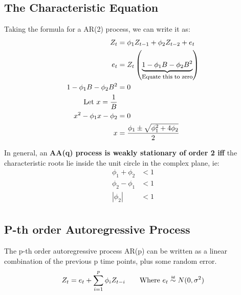 \subsection{The Characteristic Equation}
Taking the formula for a AR(2) process, we can write it as:
\begin{equation*}
    \begin{aligned}
        Z_{t} &= \phi_{1}Z_{t-1} + \phi_{2}Z_{t-2} + e_t \\
        e_{t} &= Z_{t}\left( \explain{1 - \phi_{1}B - \phi_{2}B^{2}}{Equate
        this to zero} \right) \\
                1 - \phi_{1}B - \phi_{2}B^{2} &= 0 \\
                \text{Let $x = \frac{1}{B}$} &\\
                x^{2} - \phi_{1}x - \phi_{2} &= 0 \\
                x &= \frac{\phi_{1} \pm \sqrt{\phi^{2}_{1} + 4\phi_{2}}}{2}
    \end{aligned}
\end{equation*}

In general, an \textbf{AA(q) process is weakly stationary of order 2 iff} the
characteristic roots lie inside the unit circle in the complex plane, ie:
\begin{equation*}
    \begin{aligned}
        \phi_{1} + \phi_{2} &< 1 \\
        \phi_{2} - \phi_{1} &< 1 \\
        |\phi_{2}| &< 1 \\
    \end{aligned}
\end{equation*}

\subsection{P-th order Autoregressive Process}
The p-th order autoregressive process AR(p) can be written as a linear
combination of the previous p time points, plus some random error.
\begin{equation*}
    \begin{aligned}
        Z_{t} = e_{t} + \sum_{i=1}^{p} \phi_{i}Z_{t-i} \qquad \text{Where $e_t
        \iid N(0, \sigma^2)$}
    \end{aligned}
\end{equation*}


